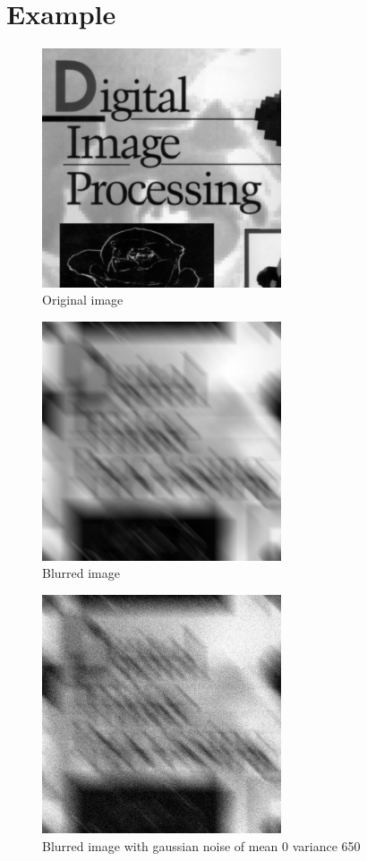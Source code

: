 \documentclass[10pt]{article}
\begin{document}
\section{Example}
\begin{figure}[!ht]
	\centering
	\includegraphics[height=200pt]{./ex5/book_cover.jpg}
	\caption{Original image}
\end{figure}
\begin{figure}[!ht]
	\centering
	\includegraphics[height=200pt]{./ex5/blurredBook.jpg}
	\caption{Blurred image}
\end{figure}
\begin{figure}[!ht]
	\centering
	\includegraphics[height=200pt]{./ex5/blurredGaussBook.jpg}
	\caption{Blurred image with gaussian noise of mean 0 variance 650}
\end{figure}
\end{document}
